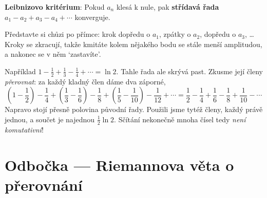 \begin{definitionbox}
  \textbf{Leibnizovo kritérium}: Pokud $a_n$ klesá k nule, pak \textbf{střídavá řada} $a_1 - a_2 + a_3 - a_4 + \cdots$ konverguje.
\end{definitionbox}

Představte si chůzi po přímce: krok dopředu o $a_1$, zpátky o $a_2$, dopředu o $a_3$, \dots Kroky se zkracují, takže kmitáte kolem nějakého bodu se stále menší amplitudou, a nakonec se v něm `zastavíte'.

\begin{center}
\end{center}

Například $1 - \frac{1}{2} + \frac{1}{3} - \frac{1}{4} + \cdots = \ln 2$. Tahle řada ale skrývá past. Zkusme její členy \textit{přerovnat}: za každý kladný člen dáme dva záporné,
\begin{equation*}
  \left(1 - \frac{1}{2}\right) - \frac{1}{4} + \left(\frac{1}{3} - \frac{1}{6}\right) - \frac{1}{8} + \left(\frac{1}{5} - \frac{1}{10}\right) - \frac{1}{12} + \cdots = \frac{1}{2} - \frac{1}{4} + \frac{1}{6} - \frac{1}{8} + \frac{1}{10} - \cdots
\end{equation*}
Napravo stojí přesně polovina původní řady. Použili jsme tytéž členy, každý právě jednou, a součet je najednou $\frac{1}{2}\ln 2$. Sčítání nekonečně mnoha čísel tedy \textit{není komutativní}!

\section{Odbočka --- Riemannova věta o přerovnání}

